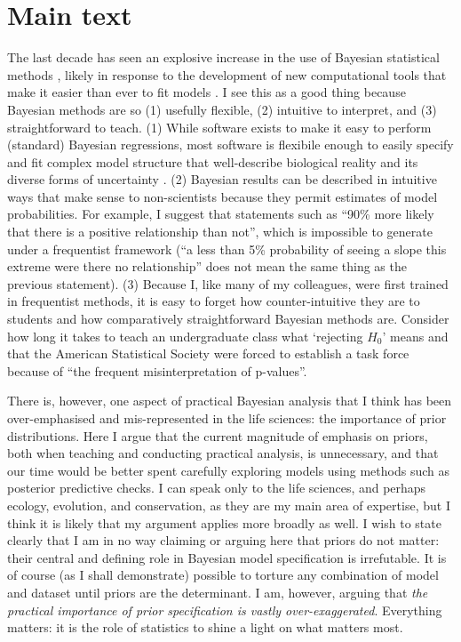\documentclass[12pt]{report}
\begin{document}
\newpage
\section{Main text}
The last decade has seen an explosive increase in the use of Bayesian statistical methods \autocite{Gelman2014}, likely in response to the development of new computational tools that make it easier than ever to fit models \autocite{Carpenter2017}. I see this as a good thing because Bayesian methods are so (1) usefully flexible, (2) intuitive to interpret, and (3) straightforward to teach. (1) While software exists to make it easy to perform (standard) Bayesian regressions, most software is flexibile enough to easily specify and fit complex model structure that well-describe biological reality and its diverse forms of uncertainty \autocite{Dietz2017}. (2) Bayesian results can be described in intuitive ways that make sense to non-scientists because they permit estimates of model probabilities. For example, I suggest that statements such as ``90\% more likely that there is a positive relationship than not'', which is impossible to generate under a frequentist framework (``a less than 5\% probability of seeing a slope this extreme were there no relationship'' does not mean the same thing as the previous statement). (3) Because I, like many of my colleagues, were first trained in frequentist methods, it is easy to forget how counter-intuitive they are to students and how comparatively straightforward Bayesian methods are. Consider how long it takes to teach an undergraduate class what `rejecting $H_0$' means and that the American Statistical Society were forced to establish a task force because of ``the frequent misinterpretation of p-values''.

There is, however, one aspect of practical Bayesian analysis that I think has been over-emphasised and mis-represented in the life sciences: the importance of prior distributions. Here I argue that the current magnitude of emphasis on priors, both when teaching and conducting practical analysis, is unnecessary, and that our time would be better spent carefully exploring models using methods such as posterior predictive checks. I can speak only to the life sciences, and perhaps ecology, evolution, and conservation, as they are my main area of expertise, but I think it is likely that my argument applies more broadly as well. I wish to state clearly that I am in no way claiming or arguing here that priors do not matter: their central and defining role in Bayesian model specification is irrefutable.  It is of course (as I shall demonstrate) possible to torture any combination of model and dataset until priors are the determinant. I am, however, arguing that \emph{the practical importance of prior specification is vastly over-exaggerated}. Everything matters: it is the role of statistics to shine a light on what matters most.
\end{document}
